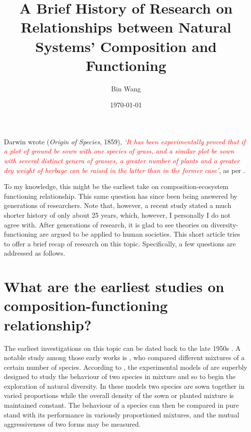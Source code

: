 \documentclass[letterpaper, 10pt]{article}
\begin{document}
\setlength{\droptitle}{-10em} 
\title{\textbf{A Brief History of Research on Relationships between Natural Systems' Composition and
Functioning}\vspace{-0em}}
\author{Bin Wang\vspace{-1em}}
\date{\today\vspace{-1em}}
\maketitle

Darwin wrote (\textit{Origin of Species}, 1859), \textcolor{red}{\textit{`It has been experimentally proved that if a plot of ground be sown with one species of grass, and a similar plot be sown with several distinct genera of grasses, a greater number of plants and a greater dry weight of herbage can be raised in the latter than in the former case'}}, as per \citet{harperdarwinian}. 

To my knowledge, this might be the earliest take on composition-ecosystem functioning relationship. This same question has since been being answered by generations of researchers. Note that, however, a recent study stated a much shorter history of only about 25 years\citep{jochum2020results}, which, however, I personally I do not agree with. After generations of research, it is glad to see theories on diversity-functioning are argued to be applied to human societies\citep{dunn2019biodiversity}. This short article tries to offer a brief recap of research on this topic. Specifically, a few questions are addressed as follows.

\section{What are the earliest studies on composition-functioning relationship?}

The earliest investigations on this topic can be dated back to the late 1950s \citep{de1960competitionthesis, de1960competition, harperdarwinian}. A notable study among those early works is \citep{de1960competition}, who compared different mixtures of a certain number of species. According to \citep{harperdarwinian}, the experimental models of \citep{de1960competition} are superbly designed to study the behaviour of two species in mixture and so to begin the exploration of natural diversity. In these models two species are sown together in varied proportions while the overall density of the sown or planted mixture is maintained constant. The behaviour of a species can then be compared in pure stand with its performance in variously proportioned mixtures, and the mutual aggressiveness of two forms may be measured.
\end{document}

